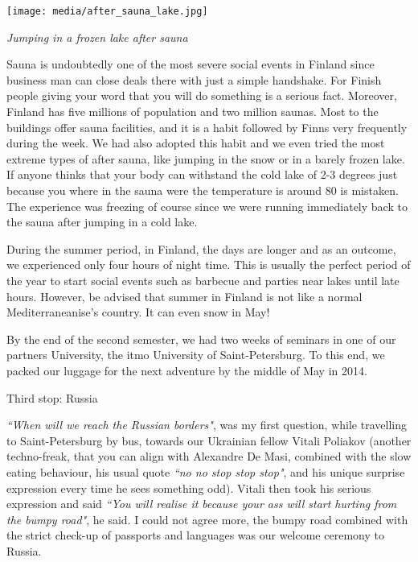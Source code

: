 \documentclass[10pt,a4paper]{article} %
\newcommand{\NewsItem}[1]{ %
\usefont{T1}{fvs}{n}{n} %
\vspace{24pt}\large #1\vspace{3pt} %
\par \normalsize \normalfont}
\begin{document}
\begin{multicols}{3}
\begin{center}
	\texttt{[image: media/after\_sauna\_lake.jpg]}
	\par\textit{Jumping in a frozen lake after sauna}
\end{center}

Sauna is undoubtedly one of the most severe social events in Finland
since business man can close deals there with just a simple handshake. 
For Finish people giving your word that you will do something is a serious fact. 
Moreover, Finland has five millions of population and two million saunas. 
Most to the buildings offer sauna facilities, and it is a habit followed by Finns 
very frequently during the week. 
We had also adopted this habit and we even tried the most extreme types of after 
sauna, like jumping in the snow or in a barely frozen lake. 
If anyone thinks that your body can withstand the cold lake of 2-3 degrees just 
because you where in the sauna were the temperature is around 80 is mistaken. 
The experience was freezing of course since we were running immediately back to the 
sauna after jumping in a cold lake.  

During the summer period, in Finland, the days are longer and as an outcome,
we experienced only four hours of night time. 
This is usually the perfect period of the year to start social events such as 
barbecue and parties near lakes until late hours. 
However, be advised that summer in Finland is not like a normal Mediterraneanise's 
country. 
It can even snow in May! 

By the end of the second semester, we had two weeks of seminars in one of our 
partners University, the {\sc itmo} University of Saint-Petersburg. 
To this end, we packed our luggage for the next adventure by the middle of May 
in 2014.	

\NewsItem{Third stop: Russia}
\textit{``When will we reach the Russian borders"}, was my first question, while 
travelling to Saint-Petersburg by bus, towards our Ukrainian fellow Vitali 
Poliakov  (another techno-freak, that you can align with Alexandre De Masi, 
combined with the slow eating behaviour, his usual quote 
\textit{``no no stop stop stop"}, and his unique surprise expression every time 
he sees something odd). 
Vitali then took his serious expression and said \textit{``You will realise it 
	because your ass will start hurting from the bumpy road"}, he said. 
I could not agree more, the bumpy road combined with the strict check-up of 
passports and languages was our welcome ceremony to Russia.


\end{multicols}
\end{document}
